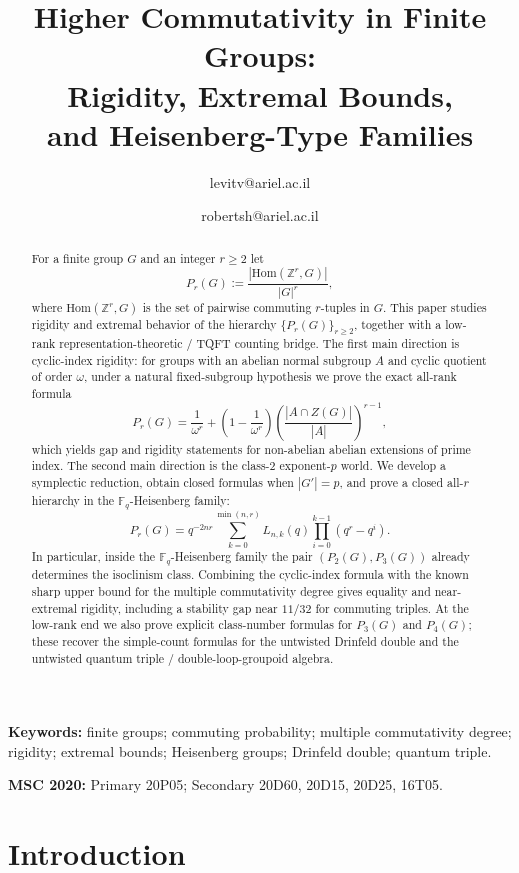 \documentclass[11pt]{article}
\author{
\Author{Vadim E. Levit}
{levitv@ariel.ac.il}
\and 
\Author{Robert Shwartz}
{robertsh@ariel.ac.il}
}
\title{Higher Commutativity in Finite Groups:\\[0.2em]
Rigidity, Extremal Bounds,\\
and Heisenberg-Type Families}
\date{}
\theoremstyle{definition}
\theoremstyle{remark}
\theoremstyle{definition}
\theoremstyle{plain}
\newcommand{\Hom}{\mathrm{Hom}}
\begin{document}
\maketitle

\begin{abstract}
For a finite group $G$ and an integer $r\ge 2$ let
\[
P_r(G):=\frac{|\Hom(\mathbb Z^r,G)|}{|G|^r},
\]
where $\Hom(\mathbb Z^r,G)$ is the set of pairwise commuting $r$-tuples in $G$. This paper studies rigidity and extremal behavior of the hierarchy $\{P_r(G)\}_{r\ge2}$, together with a low-rank representation-theoretic / TQFT counting bridge. The first main direction is cyclic-index rigidity: for groups with an abelian normal subgroup $A$ and cyclic quotient of order $\omega$, under a natural fixed-subgroup hypothesis we prove the exact all-rank formula
\[
P_r(G)=\frac{1}{\omega^r}+\left(1-\frac{1}{\omega^r}\right)\left(\frac{|A\cap Z(G)|}{|A|}\right)^{r-1},
\]
which yields gap and rigidity statements for non-abelian abelian extensions of prime index. The second main direction is the class-$2$ exponent-$p$ world. We develop a symplectic reduction, obtain closed formulas when $|G'|=p$, and prove a closed all-$r$ hierarchy in the $\mathbb F_q$-Heisenberg family:
\[
P_r(G)=q^{-2nr}\sum_{k=0}^{\min(n,r)}L_{n,k}(q)\prod_{i=0}^{k-1}(q^r-q^i).
\]
In particular, inside the $\mathbb F_q$-Heisenberg family the pair $(P_2(G),P_3(G))$ already determines the isoclinism class. Combining the cyclic-index formula with the known sharp upper bound for the multiple commutativity degree gives equality and near-extremal rigidity, including a stability gap near $11/32$ for commuting triples. At the low-rank end we also prove explicit class-number formulas for $P_3(G)$ and $P_4(G)$; these recover the simple-count formulas for the untwisted Drinfeld double and the untwisted quantum triple / double-loop-groupoid algebra.
\end{abstract}

\medskip
\noindent\textbf{Keywords:} finite groups; commuting probability; multiple commutativity degree; rigidity; extremal bounds; Heisenberg groups; Drinfeld double; quantum triple.

\medskip
\noindent\textbf{MSC 2020:} Primary 20P05; Secondary 20D60, 20D15, 20D25, 16T05.

\section{Introduction}
\end{document}
